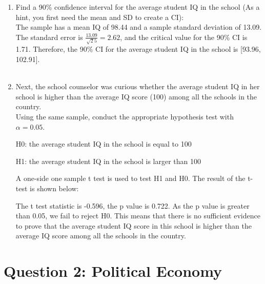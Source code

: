 \documentclass[12pt,letterpaper]{article}
\begin{document}
\begin{enumerate}
	\item Find a 90\% confidence interval for the average student IQ in the school (As a hint, you first need the mean and SD to create a CI):\\
	
	   
	  
	  \noindent The sample has a mean IQ of 98.44 and a sample standard deviation of 13.09. The standard error is $\displaystyle \frac{13.09}{\sqrt25}=2.62$, and the critical value for the 90\% CI is 1.71. Therefore, the 90\% CI for the average student IQ in the school is [93.96, 102.91]. \\ \\
	  

	
	\item Next, the school counselor was curious  whether  the average student IQ in her school is higher than the average IQ score (100) among all the schools in the country.\\ 
	\noindent Using the same sample, conduct the appropriate hypothesis test with $\alpha=0.05$.
	

	
	
	   
	   
	   \noindent  H0: the average student IQ in the school is equal to 100 
	   
	   H1: the average student IQ in the school is larger than 100 
	   
	   A one-side one sample t test is used to test H1 and H0. The result of the t-test is shown below:
	   
	   
	   
	   \noindent The t test statistic is -0.596, the p value is 0.722. As the p value is greater than 0.05, we fail to reject H0. This means that there is no sufficient evidence to prove that the average student IQ score in this school is higher than the average IQ score among all the schools in the country.
	   
	  
	
\end{enumerate}

\newpage

	\section*{Question 2: Political Economy}
\end{document}
